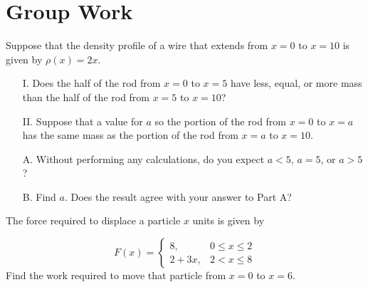 \documentclass[]{ximera}
\begin{document}
\begin{freeResponse}

\end{freeResponse}

\section{Group Work}
\begin{problem}

Suppose that the density profile of a wire that extends from $x=0$ to $x=10$ is given by $\rho(x) =2x$.

\begin{itemize}
\item[I.] Does the half of the rod from $x=0$ to $x=5$  have less, equal, or more mass than the half of the rod from $x=5$ to $x=10$?
\item[II.] Suppose that a value for $a$ so the portion of the rod from $x=0$ to $x=a$ has the same mass as the portion of the rod from $x=a$ to $x=10$.  
\item[A.] Without performing any calculations, do you expect $a<5$, $a=5$, or $a>5$?
\item[B.] Find $a$.  Does the result agree with your answer to Part A?
\end{itemize}

\end{problem}




\begin{freeResponse} 

\end{freeResponse}


\begin{problem}
The force required to displace a particle $x$ units is given by

\[
F(x) = \left\{ \begin{array}{ll} 8, &0\leq x \leq 2 \\  2+3x,  &2  < x \leq 8  \end{array} \right.
\]
Find the work required to move that particle from $x=0$ to $x=6$.
\end{problem}

\begin{freeResponse}

\end{freeResponse}

\end{document}
